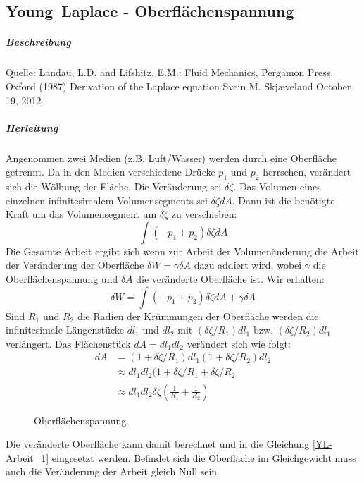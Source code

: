 \begin{refsection}
\subsection{Young–Laplace - Oberflächenspannung}
\label{Young-Laplace}
\subparagraph{Beschreibung}
\label{YL-Beschreibung}
Quelle: Landau, L.D. and Lifshitz, E.M.: Fluid Mechanics, Pergamon Press, Oxford
(1987) 
Derivation of the Laplace equation
Svein M. Skjæveland
October 19, 2012
\subparagraph{Herleitung}\label{YL-Herleitung}
Angenommen zwei Medien (z.B. Luft/Wasser) werden durch eine Oberfläche getrennt. Da in den Medien verschiedene Drücke $p_1$ und $p_2$ herrschen, verändert sich die Wölbung der Fläche. Die Veränderung sei $\delta \zeta$. Das Volumen eines einzelnen infinitesimalem Volumensegments sei $\delta \zeta dA$. Dann ist die benötigte Kraft um das Volumensegment um $\delta\zeta$ zu verschieben:
\begin{equation}
\int(-p_1+p_2)\delta \zeta dA
\end{equation}
Die Gesamte Arbeit ergibt sich wenn zur Arbeit der Volumenänderung die Arbeit der Veränderung der Oberfläche $\delta W=\gamma \delta A $ dazu addiert wird, wobei $\gamma$ die Oberflächenspannung und $\delta A$ die veränderte Oberfläche ist. Wir erhalten:
\begin{equation}\label{YL-Arbeit_1}
\delta W=\int(-p_1+p_2)\delta\zeta dA + \gamma\delta A
\end{equation}
Sind $R_1$ und $R_2$ die Radien der Krümmungen der Oberfläche werden die infinitesimale Längenstücke $dl_1$ und $dl_2$ mit $(\delta\zeta /R_1)dl_1$ bzw. $(\delta\zeta /R_2)dl_1$ verlängert. Das Flächenstück $dA=dl_1 dl_2$ verändert sich wie folgt:
\begin{equation}
\begin{split}
dA &= (1+\delta\zeta/R_1)dl_1 (1+\delta\zeta/R_2)dl_2 \\
&\approx dl_1 dl_2 (1+\delta\zeta/R_1 + \delta\zeta/R_2 \\
&\approx dl_1 dl_2 \delta\zeta (\frac{1}{R_1}+\frac{1}{R_2})
\end{split}
\end{equation} 
\begin{figure}[H]
  \centering
  \caption{Oberflächenspannung} 
\end{figure}
Die veränderte Oberfläche kann damit berechnet und in die Gleichung \ref{YL-Arbeit_1} eingesetzt werden. Befindet sich die Oberfläche im Gleichgewicht muss auch die Veränderung der Arbeit gleich Null sein.
\begin{equation}

\end{equation}
\end{refsection}
